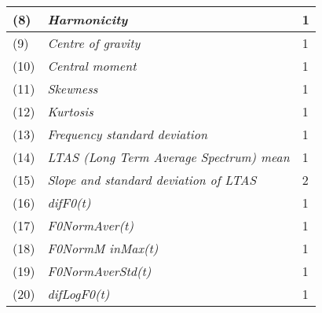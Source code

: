 \documentclass[a4paper,12pt]{article}
\begin{document}
\begin{table}[h]
{\begin{tabular}{|l|l|l|}
(8)            & \textit{Harmonicity}                                                     & 1                                                                        \\ \hline
(9)            & \textit{Centre of gravity}                                               & 1                                                                        \\ \hline
(10)           & \textit{Central moment}                                                  & 1                                                                        \\ \hline
(11)           & \textit{Skewness}                                                        & 1                                                                        \\ \hline
(12)           & \textit{Kurtosis}                                                        & 1                                                                        \\ \hline
(13)           & \textit{Frequency standard deviation}                                    & 1                                                                        \\ \hline
(14)           & \textit{LTAS (Long Term Average Spectrum) mean}                          & 1                                                                        \\ \hline
(15)           & \textit{Slope and standard deviation of LTAS}                            & 2                                                                        \\ \hline
(16)           & \textit{difF0(t)}                                                        & 1                                                                        \\ \hline
(17)           & \textit{F0NormAver(t)}                                                   & 1                                                                        \\ \hline
(18)           & \textit{F0NormM inMax(t)}                                                & 1                                                                        \\ \hline
(19)           & \textit{F0NormAverStd(t)}                                                & 1                                                                        \\ \hline
(20)           & \textit{difLogF0(t)}                                                     & 1                                                                        \\ \hline

\end{tabular}}
\end{table}
\end{document}
